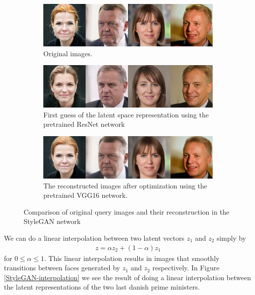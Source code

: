 \begin{figure}[h!]
    \centering
    \begin{subfigure}[b]{\textwidth}
        \includegraphics[width=\textwidth]{fig/stylegan/originals}
        \caption{Original images.}
        \label{original}
    \end{subfigure}
    \begin{subfigure}[b]{\textwidth}
    \includegraphics[width=\textwidth]{fig/stylegan/reconstructionsfirstguess.png}
    \caption{First guess of the latent space representation using the pretrained ResNet network}
    \label{firstguess}
    \end{subfigure}
    \begin{subfigure}[b]{\textwidth}
        \includegraphics[width=\textwidth]{fig/stylegan/reconstructions}
        \caption{The reconstructed images after optimization using the pretrained VGG16 network.}
        \label{optim}
    \end{subfigure}
    \caption{Comparison of original query images and their reconstruction in the StyleGAN network}
    \label{stylegan-reconstruction}
\end{figure}

We can do a linear interpolation between two latent vectors $z_1$ and $z_2$ simply by
\begin{align}
  z = \alpha z_2 + (1-\alpha)z_1
\end{align}
for $0 \leq \alpha \leq 1$. This linear interpolation results in images that smoothly transitions between faces generated by $z_1$ and $z_2$ respectively. In Figure \ref{StyleGAN-interpolation} we see the result of doing a linear interpolation between the latent representations of the two last danish prime ministers.

